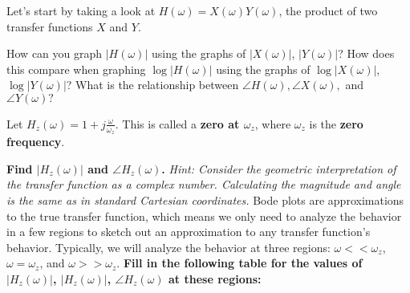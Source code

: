 \begin{enumerate}

\qitem Let's start by taking a look at $H(\omega) = X(\omega)Y(\omega)$, the product of two transfer functions $X$ and $Y$.
\begin{enumerate}
    \qitem How can you graph $|H(\omega)|$ using the graphs of $|X(\omega)|$, $|Y(\omega)|$?
    \qitem How does this compare when graphing $\log |H(\omega)|$ using the graphs of $\log |X(\omega)|$, $\log |Y(\omega)|$?
    \qitem What is the relationship between $\angle H(\omega), \angle X(\omega),$ and $\angle Y(\omega)?$
\end{enumerate}


\qitem Let $H_z(\omega) = 1 + j \frac{\omega}{\omega_z}$. This is called a \textbf{zero at $\omega_z$}, where $\omega_z$ is the \textbf{zero frequency}.
\begin{enumerate}
    \qitem \textbf{Find $|H_z(\omega)|$ and $\angle H_z(\omega)$.}
           \textit{Hint: Consider the geometric interpretation of the transfer function as a complex number.
           Calculating the magnitude and angle is the same as in standard Cartesian coordinates.}
    \qitem Bode plots are approximations to the true transfer function, which means we only need to analyze the behavior in a few regions to sketch out an approximation to any transfer function's behavior.
    Typically, we will analyze the behavior at three regions: $\omega << \omega_z$, $\omega = \omega_z$, and $\omega >> \omega_z$.
    \textbf{Fill in the following table for the values of $|H_z(\omega)|$, $|H_z(\omega)|$, $\angle H_z(\omega)$ at these regions:}


\end{enumerate}
\end{enumerate}
